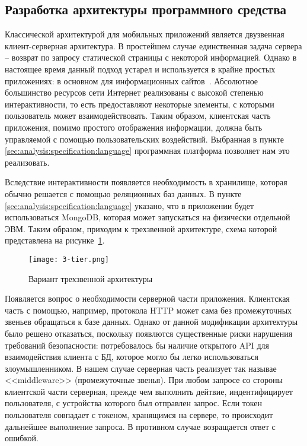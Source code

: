 \subsection{Разработка архитектуры программного средства}
\label{sec:design:architecture}

Классической архитектурой для мобильных приложений является двузвенная клиент-серверная архитектура. В простейшем случае единственная задача сервера -- возврат по запросу статической страницы с некоторой информацией. Однако в настоящее время данный подход устарел и используется в крайне простых приложениях: в основном для информационных сайтов~\cite{from_sites_to_webapps}. Абсолютное большинство ресурсов сети Интернет реализованы с высокой степенью интерактивности, то есть предоставляют некоторые элементы, с которыми пользователь может взаимодействовать. Таким образом, клиентская часть приложения, помимо простого отображения информации, должна быть управляемой с помощью пользовательских воздействий. Выбранная в пункте \ref{sec:analysis:specification:language} программная платформа позволяет нам это реализовать.

Вследствие интерактивности появляется необходимость в хранилище, которая обычно решается с помощью реляционных баз данных. В пункте \ref{sec:analysis:specification:language} указано, что в приложении будет использоваться MongoDB, которая может запускаться на физически отдельной ЭВМ. Таким образом, приходим к трехзвенной архитектуре, схема которой представлена на рисунке~\ref{fig:analysis:specification:language:3-tier}.

\begin{figure}[ht]
\centering
	\texttt{[image: 3-tier.png]}
	\caption{Вариант трехзвенной архитектуры}
	\label{fig:analysis:specification:language:3-tier}
\end{figure}

Появляется вопрос о необходимости серверной части приложения. Клиентская часть с помощью, например, протокола HTTP может сама без промежуточных звеньев обращаться к базе данных. Однако от данной модификации архитектуры было решено отказаться, поскольку появлются существенные риски нарушения требований безопасности: потребовалось бы наличие открытого API для взаимодействия клиента с БД, которое могло бы легко использоваться злоумышленником. В нашем случае серверная часть реализует так называе <<middleware>> (промежуточные звенья). При любом запросе со стороны клиентской части серверная, прежде чем выполнить дейтвие, индентифицирует пользователя, с устройства которого был отправлен запрос. Если токен пользователя совпадает с токеном, хранящимся на сервере, то происходит дальнейшее выполнение запроса. В противном случае возращается ответ с ошибкой.
